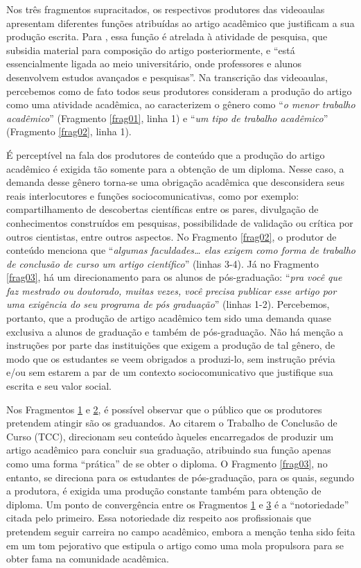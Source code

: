 Nos três fragmentos supracitados, os respectivos produtores das
videoaulas apresentam diferentes funções atribuídas ao artigo acadêmico
que justificam a sua produção escrita. Para \textcite[p.~66]{motta-roth2010}, essa função é atrelada à atividade de pesquisa, que subsidia
material para composição do artigo posteriormente, e ``está
essencialmente ligada ao meio universitário, onde professores e alunos
desenvolvem estudos avançados e pesquisas''. Na transcrição das
videoaulas, percebemos como de fato todos seus produtores consideram a
produção do artigo como uma atividade acadêmica, ao caracterizem o
gênero como ``\emph{o menor trabalho acadêmico}'' (Fragmento \ref{frag01}, linha
1) e ``\emph{um tipo de trabalho acadêmico}'' (Fragmento \ref{frag02}\hspace{0pt}, linha 1).

É perceptível na fala dos produtores de conteúdo que a produção do
artigo acadêmico é exigida tão somente para a obtenção de um diploma.
Nesse caso, a demanda desse gênero torna-se uma obrigação acadêmica que
desconsidera seus reais interlocutores e funções sociocomunicativas,
como por exemplo: compartilhamento de descobertas científicas entre os
pares, divulgação de conhecimentos construídos em pesquisas,
possibilidade de validação ou crítica por outros cientistas, entre
outros aspectos. No Fragmento \ref{frag02}, o produtor de conteúdo menciona que
``\emph{algumas faculdades\ldots{} elas exigem como forma de trabalho de
conclusão de curso um artigo científico}'' (linhas 3-4). Já no Fragmento \ref{frag03}, há um direcionamento para os alunos de pós-graduação: ``\emph{pra
você que faz mestrado ou doutorado, muitas vezes, você precisa publicar
esse artigo por uma exigência do seu programa de pós graduação}''
(linhas 1-2). Percebemos, portanto, que a produção de artigo acadêmico
tem sido uma demanda quase exclusiva a alunos de graduação e também de
pós-graduação. Não há menção a instruções por parte das instituições que
exigem a produção de tal gênero, de modo que os estudantes se veem
obrigados a produzi-lo, sem instrução prévia \cite{lillis1999} e/ou sem
estarem a par de um contexto sociocomunicativo que justifique sua
escrita e seu valor social.

Nos Fragmentos \hyperref[frag01]{1} e \hyperref[frag02]{2}, é possível observar que o público que os
produtores pretendem atingir são os graduandos. Ao citarem o Trabalho de
Conclusão de Curso (TCC), direcionam seu conteúdo àqueles encarregados
de produzir um artigo acadêmico para concluir sua graduação, atribuindo
sua função apenas como uma forma ``prática'' de se obter o diploma. O
Fragmento \ref{frag03}, no entanto, se direciona para os estudantes de
pós-graduação, para os quais, segundo a produtora, é exigida uma
produção constante também para obtenção de diploma. Um ponto de
convergência entre os Fragmentos \hyperref[frag01]{1} e \hyperref[frag03]{3} é a ``notoriedade'' citada pelo
primeiro. Essa notoriedade diz respeito aos profissionais que pretendem
seguir carreira no campo acadêmico, embora a menção tenha sido feita em
um tom pejorativo que estipula o artigo como uma mola propulsora para se
obter fama na comunidade acadêmica.

